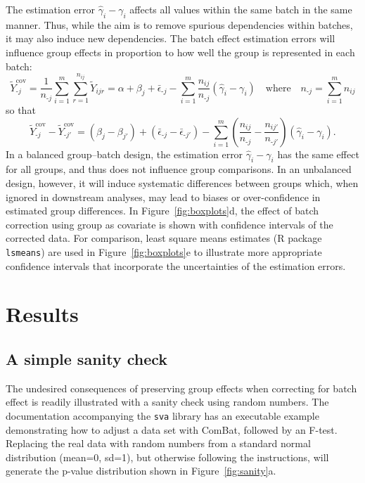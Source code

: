 \documentclass[oupdraft]{bio}
\begin{document}
The estimation error $\hat\gamma_i-\gamma_i$ affects all values within the same batch in the same manner. Thus, while the aim is to remove spurious dependencies within batches, it may also induce new dependencies. The batch effect estimation errors will influence group effects in proportion to how well the group is represented in each batch:
\begin{equation}
\tilde{Y}^{\textrm{cov}}_{\textrm{-}j}
=\frac{1}{n_{\textrm{-}j}} \sum_{i=1}^m\sum_{r=1}^{n_{ij}}\tilde{Y}_{ijr}
=\alpha+\beta_j+\bar{\epsilon}_{\textrm{-}j}
  -\sum_{i=1}^m \frac{n_{ij}}{n_{\textrm{-}j}}(\hat{\gamma}_i-\gamma_i)
\quad\text{where}\quad
n_{\textrm{-}j}=\sum_{i=1}^m n_{ij}
\end{equation}
so that
\begin{equation}
\tilde{Y}^{\textrm{cov}}_{\textrm{-}j}-\tilde{Y}^{\textrm{cov}}_{\textrm{-}j'}
=(\beta_j-\beta_{j'})+(\bar{\epsilon}_{\textrm{-}j}-\bar{\epsilon}_{\textrm{-}j'})
 -\sum_{i=1}^m \left(\frac{n_{ij}}{n_{\textrm{-}j}}-\frac{n_{ij'}}{n_{\textrm{-}j'}}\right)(\hat{\gamma}_i-\gamma_i).
\end{equation}
In a balanced group--batch design, the estimation error $\hat\gamma_i-\gamma_i$ has the same effect for all groups, and thus does not influence group comparisons. In an unbalanced design, however, it will induce systematic differences between groups which, when ignored in downstream analyses, may lead to biases or over-confidence in estimated group differences. In Figure~\ref{fig:boxplots}d, the effect of batch correction using group as covariate is shown with confidence intervals of the corrected data. For comparison, least square means estimates (R package \texttt{lsmeans}) are used in Figure~\ref{fig:boxplots}e to illustrate more appropriate confidence intervals that incorporate the uncertainties of the estimation errors.


\section{Results}

\subsection{A simple sanity check}

The undesired consequences of preserving group effects when correcting for batch effect is readily illustrated with a sanity check using random numbers. The documentation accompanying the \texttt{sva} library has an executable example demonstrating how to adjust a data set with ComBat, followed by an F-test. Replacing the real data with random numbers from a standard normal distribution (mean=0, sd=1), but otherwise following the instructions, will generate the p-value distribution shown in Figure~\ref{fig:sanity}a.
\end{document}
